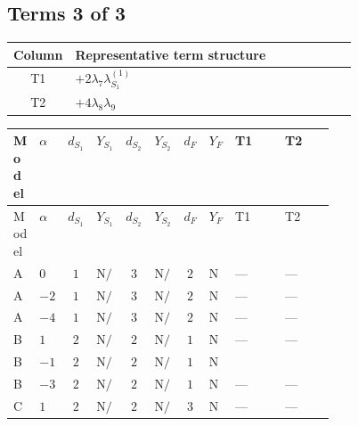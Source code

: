 \documentclass[8pt]{article}
\begin{document}
\begin{landscape}
\subsection*{Terms 3 of 3}
\begin{center}
\begin{tabular}{@{}c >{\raggedright\arraybackslash}p{0.82\linewidth}@{}}
\toprule
Column & Representative term structure \\
\midrule
T1 & \(\displaystyle +2 {\lambda_{7}} {\lambda_{S_1}^{(1)}}\) \\
\midrule
T2 & \(\displaystyle +4 {\lambda_{8}} {\lambda_{9}}\) \\
\midrule
\bottomrule
\end{tabular}
\end{center}
\smallskip
\tiny
\begin{longtable}{@{}llcccccc >{\raggedright\arraybackslash}p{0.21\linewidth} >{\raggedright\arraybackslash}p{0.21\linewidth}@{}}
\toprule
Model & $\alpha$ & $d_{S_1}$ & $Y_{S_1}$ & $d_{S_2}$ & $Y_{S_2}$ & $d_F$ & $Y_F$ & T1 & T2 \\
\midrule
\endfirsthead
\toprule
Model & $\alpha$ & $d_{S_1}$ & $Y_{S_1}$ & $d_{S_2}$ & $Y_{S_2}$ & $d_F$ & $Y_F$ & T1 & T2 \\
\midrule
\endhead
A & $0$ & $1$ & $\text{N/A}$ & $3$ & $\text{N/A}$ & $2$ & $\text{N/A}$ & --- & --- \\
\midrule
A & $-2$ & $1$ & $\text{N/A}$ & $3$ & $\text{N/A}$ & $2$ & $\text{N/A}$ & --- & --- \\
\midrule
A & $-4$ & $1$ & $\text{N/A}$ & $3$ & $\text{N/A}$ & $2$ & $\text{N/A}$ & --- & --- \\
\midrule
B & $1$ & $2$ & $\text{N/A}$ & $2$ & $\text{N/A}$ & $1$ & $\text{N/A}$ & --- & --- \\
\midrule
B & $-1$ & $2$ & $\text{N/A}$ & $2$ & $\text{N/A}$ & $1$ & $\text{N/A}$ & \scriptsize\adjustbox{max width=\linewidth}{$\begin{gathered} +2 {\lambda_{7}} {\lambda_{S_1}^{(1)}}\end{gathered}$} & \scriptsize\adjustbox{max width=\linewidth}{$\begin{gathered} +4 {\lambda_{8}} {\lambda_{9}}\end{gathered}$} \\
\midrule
B & $-3$ & $2$ & $\text{N/A}$ & $2$ & $\text{N/A}$ & $1$ & $\text{N/A}$ & --- & --- \\
\midrule
C & $1$ & $2$ & $\text{N/A}$ & $2$ & $\text{N/A}$ & $3$ & $\text{N/A}$ & --- & --- \\

\end{longtable}
\end{landscape}
\end{document}
